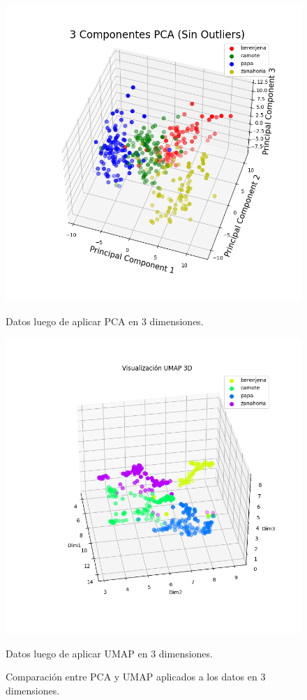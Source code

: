 \documentclass[12pt,a4paper]{article}
\begin{document}
\begin{figure}[htbp]
    \centering
    \begin{minipage}{0.45\textwidth}
        \centering
        \includegraphics[width=\textwidth]{pca_audio.png}
        \caption{Datos luego de aplicar PCA en 3 dimensiones.}
        \label{fig:pca_audio}
    \end{minipage}
    \hfill
    \begin{minipage}{0.45\textwidth}
        \centering
        \includegraphics[width=\textwidth]{umap_audio.png}
        \caption{Datos luego de aplicar UMAP en 3 dimensiones.}
        \label{fig:umap_audio}
    \end{minipage}
    \caption{Comparación entre PCA y UMAP aplicados a los datos en 3 dimensiones.}
    \label{fig:comparacion_pca_umap}
\end{figure}
\end{document}
